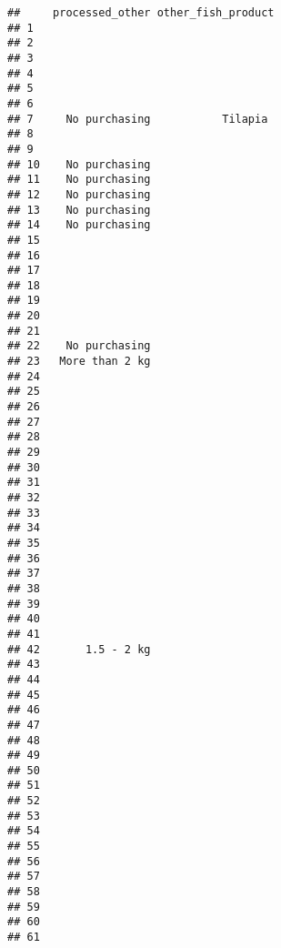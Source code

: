 \documentclass[
]{article}
\begin{document}
\begin{verbatim}
##     processed_other other_fish_product
## 1                                     
## 2                                     
## 3                                     
## 4                                     
## 5                                     
## 6                                     
## 7     No purchasing           Tilapia 
## 8                                     
## 9                                     
## 10    No purchasing                   
## 11    No purchasing                   
## 12    No purchasing                   
## 13    No purchasing                   
## 14    No purchasing                   
## 15                                    
## 16                                    
## 17                                    
## 18                                    
## 19                                    
## 20                                    
## 21                                    
## 22    No purchasing                   
## 23   More than 2 kg                   
## 24                                    
## 25                                    
## 26                                    
## 27                                    
## 28                                    
## 29                                    
## 30                                    
## 31                                    
## 32                                    
## 33                                    
## 34                                    
## 35                                    
## 36                                    
## 37                                    
## 38                                    
## 39                                    
## 40                                    
## 41                                    
## 42       1.5 - 2 kg                   
## 43                                    
## 44                                    
## 45                                    
## 46                                    
## 47                                    
## 48                                    
## 49                                    
## 50                                    
## 51                                    
## 52                                    
## 53                                    
## 54                                    
## 55                                    
## 56                                    
## 57                                    
## 58                                    
## 59                                    
## 60                                    
## 61                                    

\end{verbatim}
\end{document}
